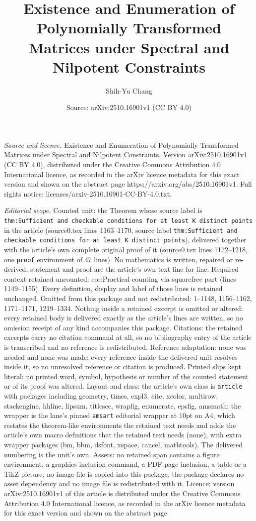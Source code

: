 \documentclass[10pt,a4paper]{amsart}
\title[Existence and Enumeration of Polynomially Transformed Matric]{Existence and Enumeration of Polynomially Transformed Matrices under Spectral and Nilpotent Constraints}
\author{Shih-Yu Chang}
\date{Source: arXiv:2510.16901v1 (CC BY 4.0)}
\begin{document}
\maketitle

\noindent\emph{Source and licence.} Existence and Enumeration of Polynomially Transformed Matrices under Spectral and Nilpotent Constraints. Version arXiv:2510.16901v1 (CC BY 4.0), distributed under the Creative Commons Attribution 4.0 International licence, as recorded in the arXiv licence metadata for this exact version and shown on the abstract page https://arxiv.org/abs/2510.16901v1. Full rights notice: licenses/arxiv-2510.16901-CC-BY-4.0.txt.\par\smallskip

\noindent\textit{Editorial scope.} Counted unit: the Theorem whose source label is \texttt{thm:Sufficient and checkable conditions for at least K distinct points} in the article (source0.tex lines 1163--1170, source label \texttt{thm:Sufficient and checkable conditions for at least K distinct points}), delivered together with the article's own complete original proof of it (source0.tex lines 1172--1218, one \texttt{proof} environment of 47 lines). No mathematics is written, repaired or re-derived: statement and proof are the article's own text line for line. Required context retained uncounted: cor:Practical counting via squarefree part (lines 1149--1155). Every definition, display and label of those lines is retained unchanged. Omitted from this package and not redistributed: 1--1148, 1156--1162, 1171--1171, 1219--1334. Nothing inside a retained excerpt is omitted or altered: every retained body is delivered exactly as the article's lines are written, so no omission receipt of any kind accompanies this package. Citations: the retained excerpts carry no citation command at all, so no bibliography entry of the article is transcribed and no reference is redistributed. Reference adaptation: none was needed and none was made; every reference inside the delivered unit resolves inside it, so no unresolved reference or citation is produced. Printed slips kept literal: no printed word, symbol, hypothesis or number of the counted statement or of its proof was altered. Layout and class: the article's own class is \texttt{article} with packages including geometry, times, expl3, cite, xcolor, multirow, stackengine, hhline, lipsum, titlesec, wrapfig, enumerate, epsfig, amsmath; the wrapper is the lane's pinned \texttt{amsart} editorial wrapper at 10pt on A4, which restates the theorem-like environments the retained text needs and adds the article's own macro definitions that the retained text needs (none), with extra wrapper packages (bm, bbm, dsfont, xspace, cancel, mathtools). The delivered numbering is the unit's own. Assets: no retained span contains a figure environment, a graphics-inclusion command, a PDF-page inclusion, a table or a TikZ picture; no image file is copied into this package, the package declares no asset dependency and no image file is redistributed with it. Licence: version arXiv:2510.16901v1 of this article is distributed under the Creative Commons Attribution 4.0 International licence, as recorded in the arXiv licence metadata for this exact version and shown on the abstract page 
\end{document}
